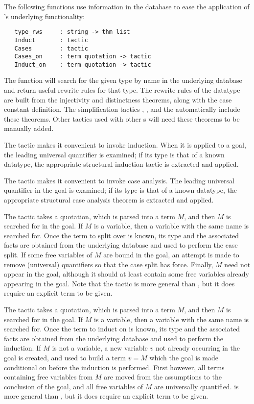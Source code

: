 The following functions use information in the database to ease the
application of \HOL's underlying functionality:

\begin{verbatim}
   type_rws     : string -> thm list
   Induct       : tactic
   Cases        : tactic
   Cases_on     : term quotation -> tactic
   Induct_on    : term quotation -> tactic
\end{verbatim}

%
The function  will search for the given type by name in
the underlying  database and return useful rewrite rules
for that type. The rewrite rules of the datatype are built from the
injectivity and distinctness theorems, along with the case constant
definition. The simplification tactics , ,
and the \simpset{}  automatically include these
theorems.  Other tactics used with other \simpset{}s will need these
theorems to be manually added.

The  tactic makes it convenient to invoke
induction. When it is applied to a goal, the leading universal
quantifier is examined; if its type is that of a known datatype, the
appropriate structural induction tactic is extracted and applied.

The  tactic makes it convenient to invoke case
analysis. The leading universal quantifier in the goal is examined; if
its type is that of a known datatype, the appropriate structural
case analysis theorem is extracted and applied.

The  tactic takes a quotation, which is
parsed into a term $M$, and then $M$ is searched for in the goal. If $M$
is a variable, then a variable with the same name is searched for. Once
the term to split over is known, its type and the associated facts are
obtained from the underlying database and used to perform the case
split. If some free variables of $M$ are bound in the goal, an attempt
is made to remove (universal) quantifiers so that the case split has
force. Finally, $M$ need not appear in the goal, although it should at
least contain some free variables already appearing in the goal. Note
that the  tactic is more general than , but
it does require an explicit term to be given.

The  tactic takes a quotation, which is parsed into a
term $M$, and then $M$ is searched for in the goal. If $M$ is a
variable, then a variable with the same name is searched for. Once the
term to induct on is known, its type and the associated facts are
obtained from the underlying database and used to perform the
induction.  If $M$ is not a variable, a new variable $v$ not already
occurring in the goal is created, and used to build a term $v = M$
which the goal is made conditional on before the induction is
performed. First however, all terms containing free variables from $M$
are moved from the assumptions to the conclusion of the goal, and all
free variables of $M$ are universally quantified.  is
more general than , but it does require an explicit term to
be given.


